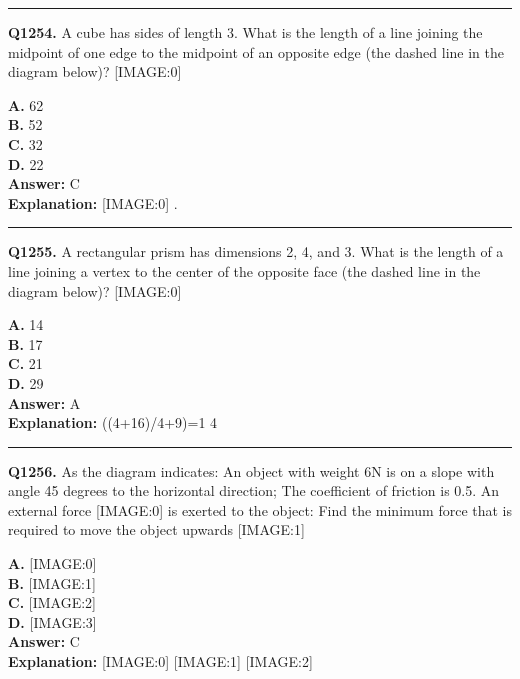 \documentclass[12pt]{article}
\begin{document}
\hrule
\vspace{1em}


\noindent
\textbf{Q1254.} A cube has sides of length 3. What is the length of a line joining the midpoint of one edge to the midpoint of an opposite edge (the dashed line in the diagram below)?
[IMAGE:0]



\textbf{A.} 6\sqrt{}2 \\
\textbf{B.} 5\sqrt{}2 \\
\textbf{C.} 3\sqrt{}2 \\
\textbf{D.} 2\sqrt{}2 \\

\textbf{Answer:} C \\
\textbf{Explanation:} [IMAGE:0]
.

\hrule
\vspace{1em}


\noindent
\textbf{Q1255.} A rectangular prism has dimensions 2, 4, and 3. What is the length of a line joining a vertex to the center of the opposite face (the dashed line in the diagram below)?
[IMAGE:0]



\textbf{A.} \sqrt{}14 \\
\textbf{B.} \sqrt{}17 \\
\textbf{C.} \sqrt{}21 \\
\textbf{D.} \sqrt{}29 \\

\textbf{Answer:} A \\
\textbf{Explanation:} \sqrt{}((4+16)/4+9)=\sqrt{}1 4

\hrule
\vspace{1em}


\noindent
\textbf{Q1256.} As the diagram indicates: An object with weight 6N is on a slope with angle 45 degrees to the horizontal direction; The coefficient of friction is 0.5. An external force
[IMAGE:0]
is exerted to the object: Find the minimum force that is required to move the object upwards
[IMAGE:1]



\textbf{A.} [IMAGE:0] \\
\textbf{B.} [IMAGE:1] \\
\textbf{C.} [IMAGE:2] \\
\textbf{D.} [IMAGE:3] \\

\textbf{Answer:} C \\
\textbf{Explanation:} [IMAGE:0]
[IMAGE:1]
[IMAGE:2]
\end{document}
